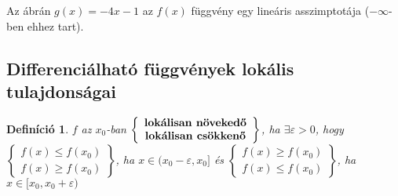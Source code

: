 \documentclass[a4paper,12pt,twoside]{book}
\newtheorem{defi}{Definíció}[chapter]
\theoremstyle{break}
\theoremstyle{plain}
\begin{document}
Az ábrán $g(x)=-4x-1$ az $f(x)$ függvény egy lineáris asszimptotája ($-\infty$-ben ehhez tart).

\subsection{Differenciálható függvények lokális tulajdonságai}

\begin{defi}
 $f$ az $x_0$-ban $\left\{\begin{array}{c}\hbox{\textbf{lokálisan növekedő}}\\\hbox{\textbf{lokálisan csökkenő}}\end{array}\right\}$, ha $\exists\varepsilon>0$, hogy $\left\{\begin{array}{c}f(x)\leqslant f(x_0)\\f(x)\geqslant f(x_0)\end{array}\right\}$, ha $x\in(x_0-\varepsilon,x_0]$ és $\left\{\begin{array}{c}f(x)\geqslant f(x_0)\\f(x)\leqslant f(x_0)\end{array}\right\}$, ha $x\in[x_0,x_0+\varepsilon)$
\end{defi}
\end{document}
